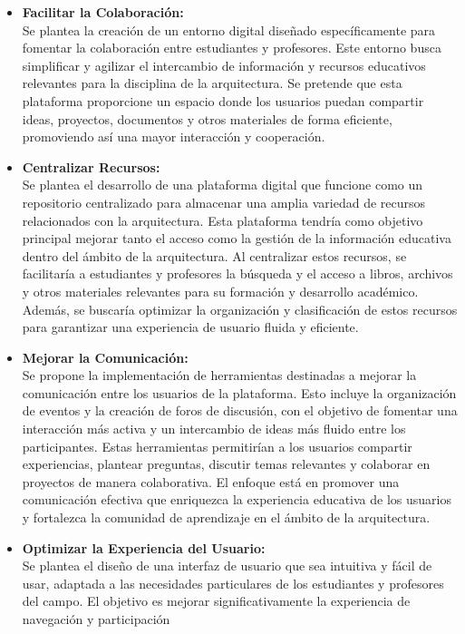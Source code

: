\documentclass[a4paper, 12pt]{book}
\begin{document}
\begin{itemize}
  \item \textbf{Facilitar la Colaboración: } \\ 
  Se plantea la creación de un entorno digital diseñado específicamente para fomentar la colaboración entre estudiantes y profesores. Este entorno busca simplificar 
  y agilizar el intercambio de información y recursos educativos relevantes para la disciplina de la arquitectura. Se pretende que esta plataforma proporcione un 
  espacio donde los usuarios puedan compartir ideas, proyectos, documentos y otros materiales de forma eficiente, promoviendo así una mayor interacción y cooperación.
  \item \textbf{Centralizar Recursos: } \\ Se plantea el desarrollo de una plataforma digital que funcione como un repositorio centralizado para almacenar una 
  amplia variedad de recursos relacionados con la arquitectura. Esta plataforma tendría como objetivo principal mejorar tanto el acceso como la gestión de la 
  información educativa dentro del ámbito de la arquitectura. Al centralizar estos recursos, se facilitaría a estudiantes y profesores la búsqueda y el acceso a 
  libros, archivos y otros materiales relevantes para su formación y desarrollo académico. Además, se buscaría optimizar la organización y clasificación de estos 
  recursos para garantizar una experiencia de usuario fluida y eficiente.
  \item \textbf{Mejorar la Comunicación: } \\ Se propone la implementación de herramientas destinadas a mejorar la comunicación entre los usuarios de la plataforma. 
  Esto incluye la organización de eventos y la creación de foros de discusión, con el objetivo de fomentar una interacción más activa y un intercambio de ideas más 
  fluido entre los participantes. Estas herramientas permitirían a los usuarios compartir experiencias, plantear preguntas, discutir temas relevantes y colaborar en 
  proyectos de manera colaborativa. El enfoque está en promover una comunicación efectiva que enriquezca la experiencia educativa de los usuarios y fortalezca la 
  comunidad de aprendizaje en el ámbito de la arquitectura.
  \item \textbf{Optimizar la Experiencia del Usuario: } \\ Se plantea el diseño de una interfaz de usuario que sea intuitiva y fácil de usar, adaptada a las 
  necesidades particulares de los estudiantes y profesores del campo. El objetivo es mejorar significativamente la experiencia de navegación y participación 

\end{itemize}
\end{document}
